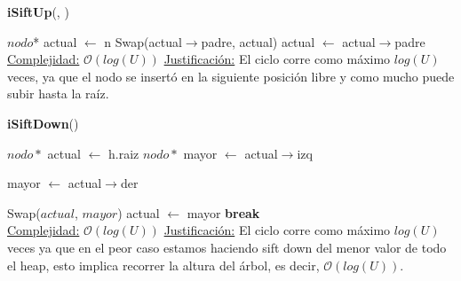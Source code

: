 \begin{Algoritmos}
    \begin{algorithm}
    \caption{\textbf{iSiftUp}(, )}
    \begin{algorithmic}
        \State $nodo$* actual $\gets$ n  
          
            \State Swap(actual$\to$padre, actual)  
            \State actual $\gets$ actual$\to$padre  
        \EndWhile
        \\
        \Statex \underline{Complejidad:} $\mathcal{O}(log(U))$
        \Statex \underline{Justificación:} El ciclo corre como máximo $log(U)$ veces, ya que el nodo se insertó en la siguiente posición libre y como mucho puede subir hasta la raíz.
    \end{algorithmic}
    \end{algorithm}

    \begin{algorithm}
    \caption{\textbf{iSiftDown}()}
    \begin{algorithmic}
        \State $nodo*$ actual $\gets$ h.raiz  
          
            \State $nodo*$ mayor $\gets$ actual$\to$izq  

              
                \State mayor $\gets$ actual$\to$der  
            \EndIf

              
                \State Swap($actual$, $mayor$)  
                \State actual $\gets$ mayor  
            \Else
                \State \textbf{break}
            \EndIf
        \EndWhile
        \\
        \Statex \underline{Complejidad:} $\mathcal{O}(log(U))$
        \Statex \underline{Justificación:} El ciclo corre como máximo $log(U)$ veces ya que en el peor caso estamos haciendo sift down del menor valor de todo el heap, esto implica recorrer la altura del árbol, es decir, $\mathcal{O}(log(U))$.
    \end{algorithmic}
    \end{algorithm}


\end{Algoritmos}
